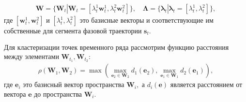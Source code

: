 \[
\label{eq:cl:3}
\begin{aligned}
\mathbf{W} = \{\textbf{W}_t| \textbf{W}_t = [\lambda^1_t\textbf{w}^1_t, \lambda^2_t\textbf{w}^2_t]\}, \quad \bm{\Lambda} = \{\bm{\lambda}_t| \bm{\lambda}_t=[\lambda^1_t, \lambda^2_t]\},
\end{aligned}
\]
где $[\textbf{w}^1_t, \textbf{w}^2_t]$ и $[\lambda^1_t, \lambda^2_t]$ это базисные векторы и соответствующие им собственные для сегмента фазовой траектории $\textbf{s}_t$.

Для кластеризации точек временного ряда рассмотрим функцию расстояния между элементами $\mathbf{W}_{t_1},\mathbf{W}_{t_2}$:
\[
\label{eq:cl:4}
\begin{aligned}
\rho\left(\textbf{W}_1, \textbf{W}_2\right) = \max\left(\max_{\textbf{e}_2 \in \textbf{W}_2} d_{1}\left(\textbf{e}_2\right), \max_{\textbf{e}_1 \in \textbf{W}_1} d_{2}\left(\textbf{e}_1\right)\right),
\end{aligned}
\]
где  $\textbf{e}_i$ это базисный вектор пространства $\textbf{W}_i,$ а $d_i\left(\textbf{e}\right)$ является расстоянием от вектора $\textbf{e}$ до пространства $\textbf{W}_i$.

